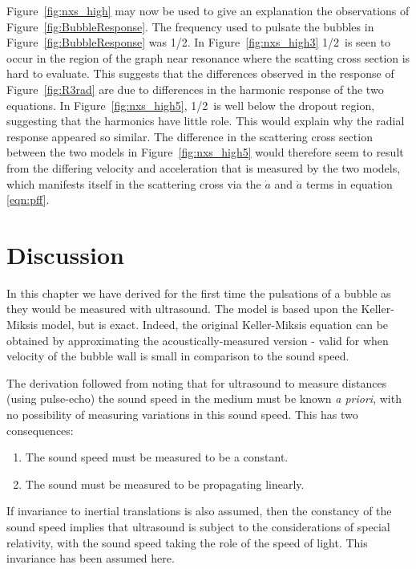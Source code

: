 \documentclass[10pt, fleqn,draft,showtrims,oldfontcommands]{article} %
\newcommand{\eqnref}[1]{\ref{eqn:#1}}
\newcommand{\figref}[1]{Figure~\ref{fig:#1}}
\newcommand{\Figref}[1]{Figure~\ref{fig:#1}}
\begin{document}
\Figref{nxs_high} may now be used to give an explanation the observations of \figref{BubbleResponse}.
The frequency used to pulsate the bubbles in \figref{BubbleResponse} was \unit{1/2}\mega\hertz.
In \figref{nxs_high3} \unit{1/2}\mega\hertz\ is seen to occur in the region of the graph near resonance where 
the scatting cross section is hard to evaluate.
This suggests that the differences observed in the response of \figref{R3rad} 
are due to differences in the harmonic response of the two equations.
In \figref{nxs_high5}, \unit{1/2}\mega\hertz\ is well below the dropout region, 
suggesting that the harmonics have little role.
This would explain why the radial response appeared so similar.
The difference in the scattering cross section between the two models in \figref{nxs_high5} 
would therefore seem to result from the differing velocity and acceleration that is measured by the two models,
which manifests itself in the scattering cross via the $\dot a$ and $\ddot a$ terms in equation \eqnref{pff}.


\section{Discussion}\label{sec:discussion}

In this chapter we have derived for the first time the pulsations of a bubble as they would be measured with ultrasound.
The model is based upon the Keller-Miksis model, but is exact.
Indeed, the original Keller-Miksis equation can be obtained by approximating the acoustically-measured version -
valid for when velocity of the bubble wall is small in comparison to the sound speed.

The derivation followed from noting that for ultrasound to measure distances (using pulse-echo) 
the sound speed in the medium must be known {\em a priori}, 
with no possibility of measuring variations in this sound speed.
This has two consequences:
\begin{enumerate}
  \item The sound speed must be measured to be a constant.
  \item The sound must be measured to be propagating linearly.
\end{enumerate}
If invariance to inertial translations is also assumed,
then the constancy of the sound speed  implies that 
ultrasound is subject to the considerations of special relativity,
with the sound speed taking the role of the speed of light.
This invariance has been assumed here.
\end{document}
